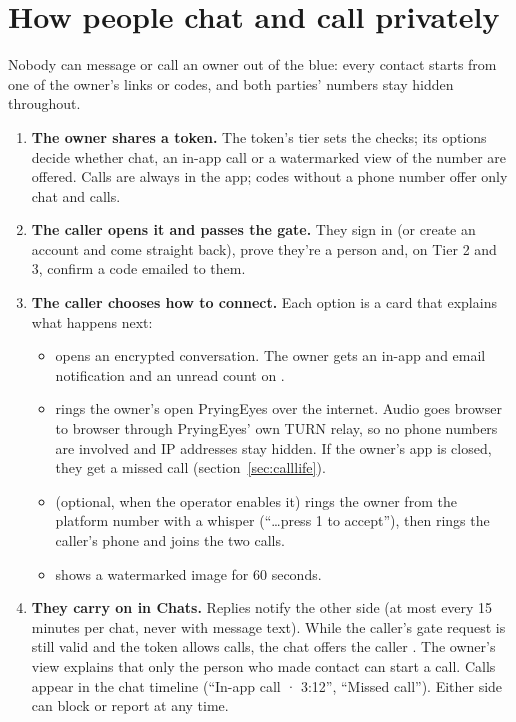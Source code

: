 \section{How people chat and call privately}
\label{sec:reach}

Nobody can message or call an owner out of the blue: every contact starts from one of the owner's links or codes, and both parties' numbers stay hidden throughout.

\begin{enumerate}
  \item \textbf{The owner shares a token.} The token's tier sets the checks; its options decide whether chat, an in-app call or a watermarked view of the number are offered. Calls are always in the app; codes without a phone number offer only chat and calls.
  \item \textbf{The caller opens it and passes the gate.} They sign in (or create an account and come straight back), prove they're a person and, on Tier 2 and 3, confirm a code emailed to them.
  \item \textbf{The caller chooses how to connect.} Each option is a card that explains what happens next:
  \begin{itemize}
    \item {} opens an encrypted conversation. The owner gets an in-app and email notification and an unread count on .
    \item {} rings the owner's open PryingEyes over the internet. Audio goes browser to browser through PryingEyes' own TURN relay, so no phone numbers are involved and IP addresses stay hidden. If the owner's app is closed, they get a missed call (section~\ref{sec:calllife}).
    \item {} (optional, when the operator enables it) rings the owner from the platform number with a whisper (``\ldots press 1 to accept''), then rings the caller's phone and joins the two calls.
    \item {} shows a watermarked image for 60 seconds.
  \end{itemize}
  \item \textbf{They carry on in Chats.} Replies notify the other side (at most every 15 minutes per chat, never with message text). While the caller's gate request is still valid and the token allows calls, the chat offers the caller . The owner's view explains that only the person who made contact can start a call. Calls appear in the chat timeline (``In-app call · 3:12'', ``Missed call''). Either side can block or report at any time.
\end{enumerate}

